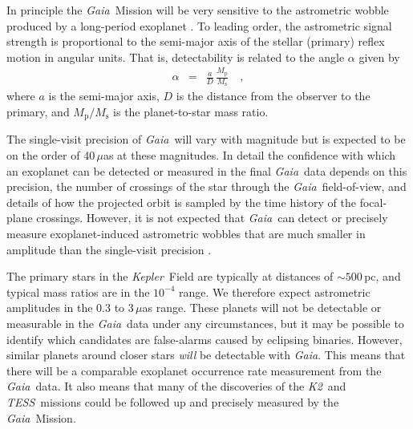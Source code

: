 \documentclass[manuscript, letterpaper]{aastex6}
\makeatletter
\let\origsection\section
\renewcommand\section{\@ifstar{\starsection}{\nostarsection}}
\newcommand\nostarsection[1]{\sectionprelude\origsection{#1}}
\newcommand\starsection[1]{\sectionprelude\origsection*{#1}}
\newcommand\sectionprelude{\vspace{1em}}
\newcommand{\project}[1]{\textsl{#1}}
\newcommand{\kepler}{\project{Kepler}}
\newcommand{\KT}{\project{K2}}
\newcommand{\tess}{\project{TESS}}
\newcommand{\gaia}{\project{Gaia}}
\newcommand{\sectlabel}[1]{\label{sect:#1}}
\makeatother
\begin{document}
In principle the \gaia\ Mission will be very sensitive to the astrometric
wobble produced by a long-period exoplanet \citep{Perryman:2014}.
To leading order, the astrometric signal strength is proportional to the
semi-major axis of the stellar (primary) reflex motion in angular units.
That is, detectability is related to the angle $\alpha$ given by
\begin{eqnarray}
\alpha &=& \frac{a}{D}\,\frac{M_{\mathrm p}}{M_{\mathrm s}} \quad ,
\end{eqnarray}
where $a$ is the semi-major axis, $D$ is the distance from the observer to the
primary, and $M_{\mathrm{p}}/M_{\mathrm{s}}$ is the planet-to-star mass ratio.

The single-visit precision of \gaia\ will vary with magnitude but is expected
to be on the order of 40\,$\mu$as at these magnitudes.
In detail the confidence with which an exoplanet can be detected or measured
in the final \gaia\ data depends on this precision, the number of crossings of
the star through the \gaia\ field-of-view, and details of how the projected
orbit is sampled by the time history of the focal-plane crossings.
However, it is not expected that \gaia\ can detect or precisely measure
exoplanet-induced astrometric wobbles that are much smaller in amplitude than
the single-visit precision \citep{Perryman:2014}.

The primary stars in the \kepler\  Field are typically at distances of $\sim
500$\,pc, and typical mass ratios are in the $10^{-4}$ range.
We therefore expect astrometric amplitudes in the 0.3 to 3\,$\mu$as range.
These planets will not be detectable or measurable in the \gaia\ data under
any circumstances, but it may be possible to identify which candidates are
false-alarms caused by eclipsing binaries.
However, similar planets around closer stars \emph{will} be detectable with
\gaia.
This means that there will be a comparable exoplanet occurrence rate
measurement from the \gaia\ data.
It also means that many of the discoveries of the \KT\ and \tess\ missions
could be followed up and precisely measured by the \gaia\ Mission.


\section{Summary}\sectlabel{summary}
\end{document}
